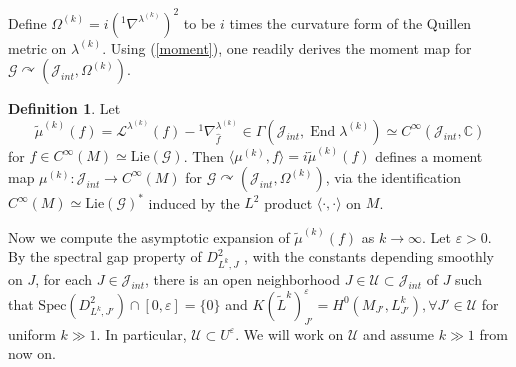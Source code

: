 \documentclass[12pt,reqno,a4paper]{amsart}
\numberwithin{equation}{section}
\DeclareMathOperator{\End}{End}
\theoremstyle{definition}
\newtheorem{definition}{Definition}
\theoremstyle{remark}
\begin{document}
Define $\Omega^{(k)}=i({}^1\nabla^{\lambda^{(k)}})^2$ to be $i$ times the curvature form of the Quillen metric on $\lambda^{(k)}$. Using (\ref{moment}), one readily derives the moment map for $\mathcal{G}\curvearrowright (\mathcal{J}_{int},\Omega^{(k)})$.
\begin{definition}
Let
\begin{equation*}
\widetilde{\mu}^{(k)}(f)=\mathcal{L}^{\lambda^{(k)}}(f)-{}^1\nabla^{\lambda^{(k)}}_{\widehat{f}}\in \Gamma(\mathcal{J}_{int},\End{\lambda^{(k)}})\simeq C^\infty(\mathcal{J}_{int},\mathbb{C})
\end{equation*}
for $f\in C^\infty(M)\simeq \mathrm{Lie}(\mathcal{G})$. Then $\langle \mu^{(k)}, f\rangle=i\widetilde{\mu}^{(k)}(f)$ defines a moment map $\mu^{(k)}:\mathcal{J}_{int}\rightarrow C^\infty(M)$ for $\mathcal{G}\curvearrowright (\mathcal{J}_{int},\Omega^{(k)})$, via the identification $C^\infty(M)\simeq \mathrm{Lie}(\mathcal{G})^*$ induced by the $L^2$ product $\langle\cdot,\cdot\rangle$ on $M$.
\end{definition}

Now we compute the asymptotic expansion of $\widetilde{\mu}^{(k)}(f)$ as $k\rightarrow\infty$. Let $\varepsilon>0$. By the spectral gap property of $D^2_{L^k,J}$ \cite[Theorem 1.5.5]{ma2007holomorphic}, with the constants depending smoothly on $J$, for each $J\in \mathcal{J}_{int}$, there is an open neighborhood $J\in\mathcal{U}\subset\mathcal{J}_{int}$ of $J$ such that $\mathrm{Spec}(D_{L^k,J'}^2)\cap [0,\varepsilon]=\{0\}$ and $K(\tilde{L}^k)^\varepsilon_{J'}=H^0(M_{J'},L^k_{J'}), \forall J'\in\mathcal{U}$ for uniform $k\gg 1$. In particular, $\mathcal{U}\subset U^\varepsilon$. We will work on $\mathcal{U}$ and assume $k\gg1$ from now on.
\end{document}
